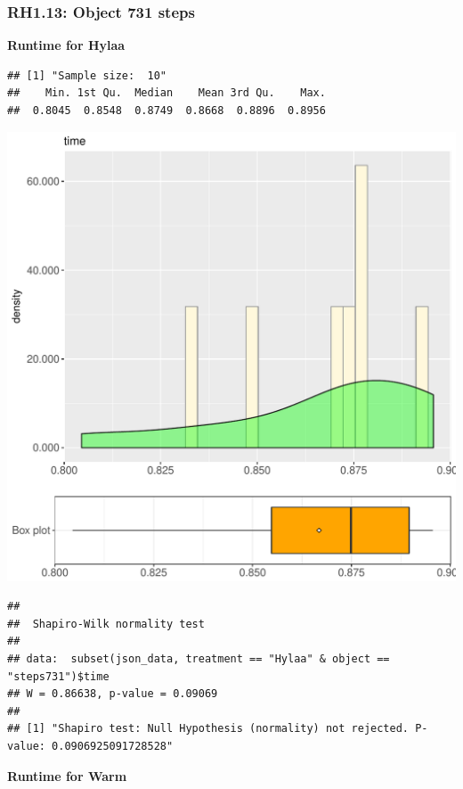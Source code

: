 \documentclass{article}\usepackage[]{graphicx}\usepackage[]{color}
\makeatletter
\def\maxwidth{ %
  \ifdim\Gin@nat@width>\linewidth
    \linewidth
  \else
    \Gin@nat@width
  \fi
}
\newenvironment{kframe}{%
 \def\at@end@of@kframe{}%
 \ifinner\ifhmode%
  \def\at@end@of@kframe{\end{minipage}}%
  \begin{minipage}{\columnwidth}%
 \fi\fi%
 \def\FrameCommand##1{\hskip\@totalleftmargin \hskip-\fboxsep
 \colorbox{shadecolor}{##1}\hskip-\fboxsep
     \hskip-\linewidth \hskip-\@totalleftmargin \hskip\columnwidth}%
 \MakeFramed {\advance\hsize-\width
   \@totalleftmargin\z@ \linewidth\hsize
   \@setminipage}}%
 {\par\unskip\endMakeFramed%
 \at@end@of@kframe}
\newenvironment{knitrout}{}{} %
\makeatother
\begin{document}
\subsubsection{RH1.13: Object 731 steps}

 \textbf{Runtime for Hylaa}
\begin{knitrout}
\color{fgcolor}\begin{kframe}
\begin{verbatim}
## [1] "Sample size:  10"
##    Min. 1st Qu.  Median    Mean 3rd Qu.    Max. 
##  0.8045  0.8548  0.8749  0.8668  0.8896  0.8956
\end{verbatim}
\end{kframe}
\includegraphics[width=\maxwidth]{figure/RH1_Hylaa_steps731-1} 
\begin{kframe}\begin{verbatim}
## 
## 	Shapiro-Wilk normality test
## 
## data:  subset(json_data, treatment == "Hylaa" & object == "steps731")$time
## W = 0.86638, p-value = 0.09069
## 
## [1] "Shapiro test: Null Hypothesis (normality) not rejected. P-value: 0.0906925091728528"
\end{verbatim}
\end{kframe}
\end{knitrout}
 \textbf{Runtime for Warm}
\end{document}
